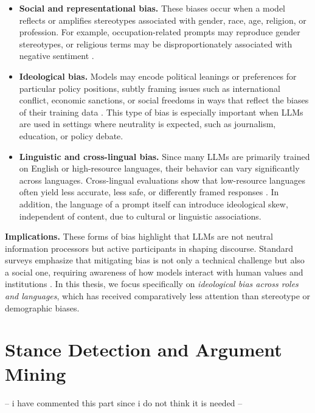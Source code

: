 \begin{itemize}
    \item \textbf{Social and representational bias.} These biases occur when a model reflects or amplifies stereotypes associated with gender, race, age, religion, or profession. For example, occupation-related prompts may reproduce gender stereotypes, or religious terms may be disproportionately associated with negative sentiment \parencite{gender_gpt2023}\parencite{stereoset2021}\parencite{crows2020pairs}.  

    \item \textbf{Ideological bias.} Models may encode political leanings or preferences for particular policy positions, subtly framing issues such as international conflict, economic sanctions, or social freedoms in ways that reflect the biases of their training data \parencite{silence_llms2023}\parencite{opiniongpt2023}\parencite{russia_china_war2024}. This type of bias is especially important when LLMs are used in settings where neutrality is expected, such as journalism, education, or policy debate.  

    \item \textbf{Linguistic and cross-lingual bias.} Since many LLMs are primarily trained on English or high-resource languages, their behavior can vary significantly across languages. Cross-lingual evaluations show that low-resource languages often yield less accurate, less safe, or differently framed responses \parencite{nationality_bias2013}\parencite{silence_llms2023}. In addition, the language of a prompt itself can introduce ideological skew, independent of content, due to cultural or linguistic associations.  
\end{itemize}

\textbf{Implications.}  
These forms of bias highlight that LLMs are not neutral information processors but active participants in shaping discourse. Standard surveys emphasize that mitigating bias is not only a technical challenge but also a social one, requiring awareness of how models interact with human values and institutions \parencite{navigating-llm-ethics}\parencite{STAHL2024102700}. In this thesis, we focus specifically on \emph{ideological bias across roles and languages}, which has received comparatively less attention than stereotype or demographic biases.


\section{Stance Detection and Argument Mining}
 -- i have commented this part since i do not think it is needed -- 


